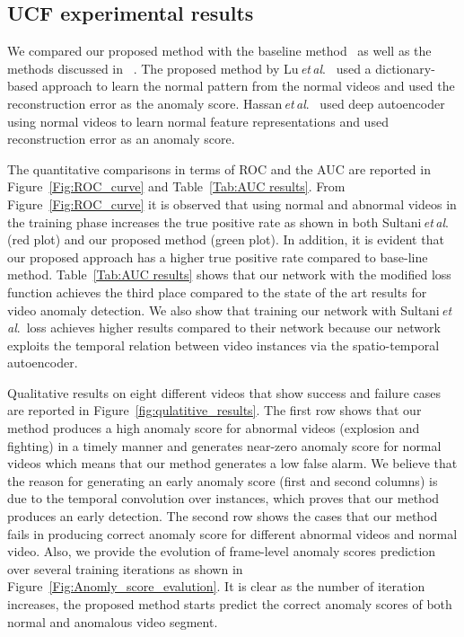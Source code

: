 \documentclass[journal]{IEEEtran}
\newcommand{\authorcite}{{\textit{et}\,\textit{al}.}}
\begin{document}
\subsection{UCF experimental results}
We compared our proposed method with the baseline method~\cite{sultani2018real} as well as the methods discussed in ~\cite{hasan2016learning,lu2013abnormal}. The proposed method by Lu\,\authorcite~\cite{lu2013abnormal} used a dictionary-based approach to learn the normal pattern from the normal videos and used the reconstruction error as the anomaly score. Hassan\,\authorcite~\cite{hasan2016learning} used deep autoencoder using normal videos to learn normal feature representations and used reconstruction error as an anomaly score.



The quantitative comparisons in terms of ROC and the AUC are reported in Figure~\ref{Fig:ROC_curve} and Table~\ref{Tab:AUC results}. From Figure~\ref{Fig:ROC_curve} it is observed that using normal and abnormal videos in the training phase increases the true positive rate as shown in both Sultani\,\authorcite~\cite{sultani2018real} (red plot) and our proposed method (green plot). In addition, it is evident that our proposed approach has a higher true positive rate compared to base-line method. Table~\ref{Tab:AUC results} shows that our network with the modified loss function achieves the third place compared to the state of the art results for video anomaly detection. We also show that training our network with Sultani\,\authorcite~loss achieves higher results compared to their network because our network exploits the temporal relation between video instances via the spatio-temporal autoencoder. 

Qualitative results on eight different videos that show success and failure cases are reported in Figure~\ref{fig:qulatitive_results}. The first row shows that our method produces a high anomaly score for abnormal videos (explosion and fighting) in a timely manner and generates near-zero anomaly score for normal videos which means that our method generates a low false alarm. We believe that the reason for generating an early anomaly score (first and second columns) is due to the temporal convolution over instances, which proves that our method produces an early detection. The second row shows the cases that our method fails in producing correct anomaly score for different abnormal videos and normal video. 
Also, we provide the evolution of frame-level anomaly scores prediction over several training iterations as shown in Figure~\ref{Fig:Anomly_score_evalution}. It is clear as the number of iteration increases, the proposed method starts predict the correct anomaly scores of both normal and anomalous video segment. 
\end{document}
